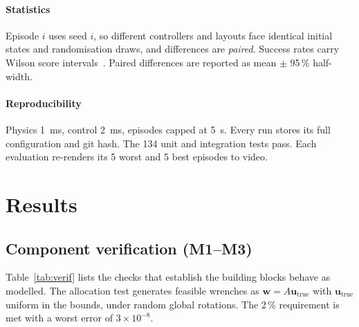 \documentclass[conference]{IEEEtran}
\newcommand{\vect}[1]{\boldsymbol{#1}}
\begin{document}
\paragraph*{Statistics} Episode $i$ uses seed $i$, so different controllers and layouts face identical initial states and randomisation draws, and differences are \emph{paired}. Success rates carry Wilson score intervals~\cite{wilson1927}. Paired differences are reported as mean $\pm$ 95\,\% half-width.

\paragraph*{Reproducibility} Physics \SI{1}{ms}, control \SI{2}{ms}, episodes capped at \SI{5}{s}. Every run stores its full configuration and git hash. The 134 unit and integration tests pass. Each evaluation re-renders its 5 worst and 5 best episodes to video.

\section{Results}
\label{sec:results}

\subsection{Component verification (M1--M3)}
Table~\ref{tab:verif} lists the checks that establish the building blocks behave as modelled. The allocation test generates feasible wrenches as $\vect w=A\vect u_{\text{true}}$ with $\vect u_{\text{true}}$ uniform in the bounds, under random global rotations. The 2\,\% requirement is met with a worst error of $3\times10^{-8}$.
\end{document}
